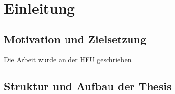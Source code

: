 \chapter{Einleitung}

\section{Motivation und Zielsetzung}

Die Arbeit wurde an der \ac{HFU} geschrieben.

\section{Struktur und Aufbau der Thesis}

